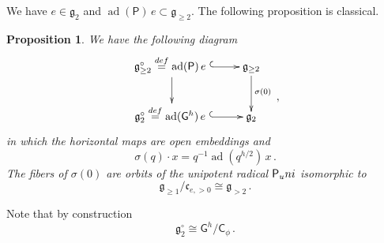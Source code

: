 \documentclass[14pt]{extarticle}
\newcommand{\bG}{\mathsf{G}}
\newcommand{\sP}{\mathsf{P}}
\newcommand{\bC}{\mathsf{C}}
\newcommand{\fg}{\mathfrak{g}}
\newcommand{\fc}{\mathfrak{c}}
\newcommand{\uni}{\textup{uni}}
\DeclareMathOperator{\ad}{ad}
\newtheorem{Proposition}[Lemma]{Proposition}
\theoremstyle{definition}
\begin{document}
\subsubsection{} 
We have  $e\in \fg_2$ and $\ad(\sP) \, e \subset \fg_{\ge 2}$. 
The following proposition is classical.


\begin{Proposition}\label{p_open} 
We have the following diagram
%
\begin{equation}
  \label{eq:22_}
  \raisebox{30pt}{\xymatrix{
    \fg^\circ_{\ge 2} \overset{\textup{\tiny def}}= \ad(\sP) \, e \, \,   \ar@{^{(}->}[r] \ar[d] &
    \fg_{\ge 2} \ar[d]^{\sigma(0)} 
    \\
    \fg^\circ_{2} \overset{\textup{\tiny def}}= \ad(\bG^h) \, e  \, \,  \ar@{^{(}->}[r] & \fg_{
      2}}}\,, 
\end{equation}
%
in which the horizontal maps are open embeddings and
%
\begin{equation}
  \sigma(q) \cdot x =
  q^{-1} \ad(q^{h/2}) \, x \,.\label{eq:141_sigma}
\end{equation}
%
The fibers of $\sigma(0)$ are orbits of the unipotent radical
$\sP_\uni$  isomorphic to 
%
\begin{equation}
\fg_{\ge
  1}\big/\fc_{e,>0} \cong \fg_{>2} \,.\label{eq:27_}
\end{equation}
%
\end{Proposition}



\noindent Note that by construction 
%
\begin{equation}
  \label{eq:58_}
  \fg^\circ_{2}  \cong \bG^h / \bC_\phi \,. 
\end{equation}
\end{document}
